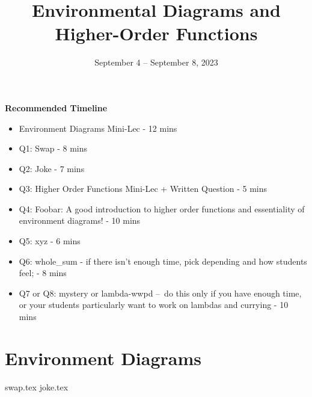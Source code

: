 \documentclass{exam}
\title{Environmental Diagrams \titlebreak and Higher-Order Functions}
\date{September 4 -- September 8, 2023}
\begin{document}
\maketitle

\begin{blocksection}
\begin{guide}
\textbf{Recommended Timeline}


\begin{itemize}
    \item Environment Diagrams Mini-Lec - 12 mins
    \item Q1: Swap - 8 mins
    \item Q2: Joke - 7 mins
    \item Q3: Higher Order Functions Mini-Lec + Written Question - 5 mins
    \item Q4: Foobar: A good introduction to higher order functions and essentiality of environment diagrams! - 10 mins
    \item Q5: xyz - 6 mins
    \item Q6: whole\_sum - if there isn't enough time, pick depending and how students feel; - 8 mins
    \item Q7 or Q8: mystery or lambda-wwpd – do this only if you have enough time, or your students particularly want to work on lambdas and currying - 10 mins
\end{itemize}
\end{guide}
\end{blocksection}


\section{Environment Diagrams}

\begin{questions}
{swap.tex}
{joke.tex}
\end{questions}
\end{document}
